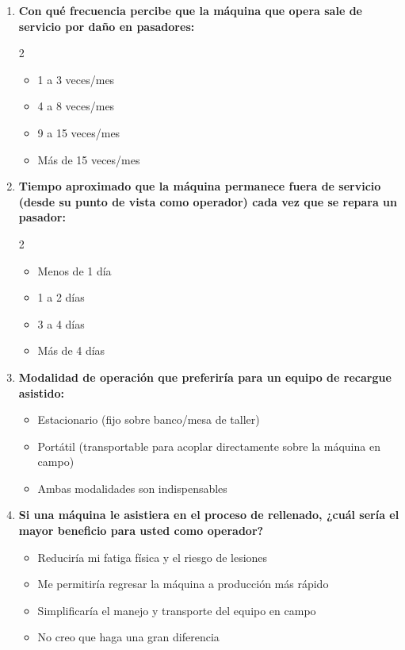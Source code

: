 \documentclass[11pt,a4paper]{article}
\begin{document}
\begin{enumerate}[resume=encuesta, leftmargin=*]
    \item \textbf{Con qué frecuencia percibe que la máquina que opera sale de servicio por daño en pasadores:}
    \begin{multicols}{2}
    \begin{itemize}[label=$\square$, leftmargin=*]
        \item 1 a 3 veces/mes
        \item 4 a 8 veces/mes
        \item 9 a 15 veces/mes
        \item Más de 15 veces/mes
    \end{itemize}
    \end{multicols}

    \item \textbf{Tiempo aproximado que la máquina permanece fuera de servicio (desde su punto de vista como operador) cada vez que se repara un pasador:}
    \begin{multicols}{2}
    \begin{itemize}[label=$\square$, leftmargin=*]
        \item Menos de 1 día
        \item 1 a 2 días
        \item 3 a 4 días
        \item Más de 4 días
    \end{itemize}
    \end{multicols}

    \item \textbf{Modalidad de operación que preferiría para un equipo de recargue asistido:}
    \begin{itemize}[label=$\square$, leftmargin=*]
        \item Estacionario (fijo sobre banco/mesa de taller)
        \item Portátil (transportable para acoplar directamente sobre la máquina en campo)
        \item Ambas modalidades son indispensables
    \end{itemize}

    \item \textbf{Si una máquina le asistiera en el proceso de rellenado, ¿cuál sería el mayor beneficio para usted como operador?}
    \begin{itemize}[label=$\square$, leftmargin=*]
        \item Reduciría mi fatiga física y el riesgo de lesiones
        \item Me permitiría regresar la máquina a producción más rápido
        \item Simplificaría el manejo y transporte del equipo en campo
        \item No creo que haga una gran diferencia
    \end{itemize}


\end{enumerate}
\end{document}
